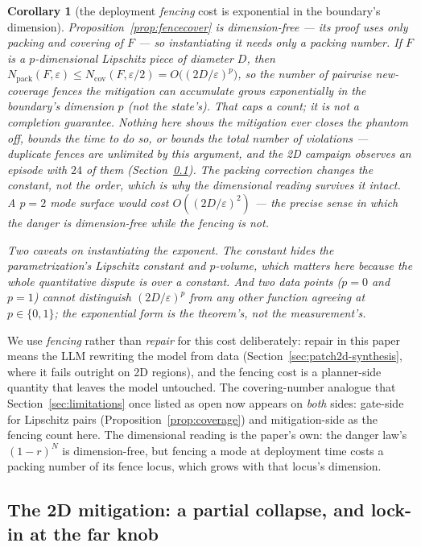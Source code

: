 \documentclass[11pt]{article}
\newtheorem{corollary}{Corollary}
\theoremstyle{definition}
\theoremstyle{remark}
\begin{document}
\begin{corollary}[the deployment \emph{fencing} cost is exponential in the boundary's dimension]
\label{cor:fencedim}
Proposition~\ref{prop:fencecover} is dimension-free --- its proof uses only packing and covering of $F$ --- so instantiating it needs only a packing number. If $F$ is a $p$-dimensional Lipschitz piece of diameter $D$, then $N_{\mathrm{pack}}(F,\varepsilon) \leq N_{\mathrm{cov}}(F,\varepsilon/2) = O\big((2D/\varepsilon)^{p}\big)$, so the number of \emph{pairwise new-coverage} fences the mitigation can accumulate grows exponentially in the \emph{boundary's} dimension $p$ (not the state's). That caps a count; it is not a completion guarantee. Nothing here shows the mitigation ever closes the phantom off, bounds the time to do so, or bounds the total number of violations --- duplicate fences are unlimited by this argument, and the 2D campaign observes an episode with $24$ of them (Section~\ref{sec:patch2d-mitigation}). The packing correction changes the constant, not the order, which is why the dimensional reading survives it intact. A $p=2$ mode surface would cost $O((2D/\varepsilon)^2)$ --- the precise sense in which the \emph{danger} is dimension-free while the \emph{fencing} is not.

Two caveats on instantiating the exponent. The constant hides the parametrization's Lipschitz constant and $p$-volume, which matters here because the whole quantitative dispute is over a constant. And two data points ($p = 0$ and $p = 1$) cannot distinguish $(2D/\varepsilon)^p$ from any other function agreeing at $p \in \{0,1\}$; the exponential form is the theorem's, not the measurement's.
\end{corollary}

We use \emph{fencing} rather than \emph{repair} for this cost deliberately: repair in this paper means the LLM rewriting the model from data (Section~\ref{sec:patch2d-synthesis}, where it fails outright on 2D regions), and the fencing cost is a planner-side quantity that leaves the model untouched. The covering-number analogue that Section~\ref{sec:limitations} once listed as open now appears on \emph{both} sides: gate-side for Lipschitz pairs (Proposition~\ref{prop:coverage}) and mitigation-side as the fencing count here. The dimensional reading is the paper's own: the danger law's $(1-r)^N$ is dimension-free, but fencing a mode at deployment time costs a packing number of its fence locus, which grows with that locus's dimension.

\subsection{The 2D mitigation: a partial collapse, and lock-in at the far knob}
\label{sec:patch2d-mitigation}
\end{document}
